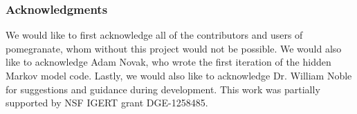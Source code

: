 \documentclass{article}
\begin{document}
\subsubsection*{Acknowledgments}
We would like to first acknowledge all of the contributors and users of pomegranate, whom without this project would not be possible. We would also like to acknowledge Adam Novak, who wrote the first iteration of the hidden Markov model code. Lastly, we would also like to acknowledge Dr. William Noble for suggestions and guidance during development. This work was partially supported by NSF IGERT grant DGE-1258485.



\end{document}
